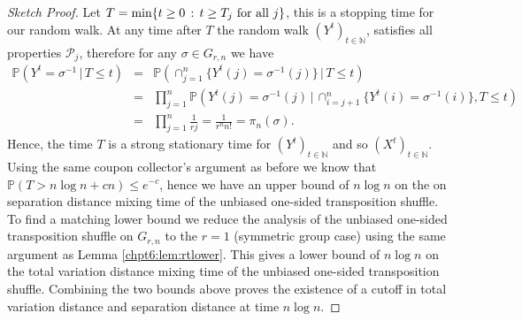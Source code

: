 \documentclass[11pt]{report}
\begin{document}
\begin{proof}[Sketch Proof]
	Let $T= \min \{t\geq 0 \,: \, t \geq T_{j} \textnormal{ for all $j$}\}$, this is a stopping time for our random walk. At any time after $T$ the random walk $(Y^{t})_{t\in\mathbb{N}}$, satisfies all properties $\mathcal{P}_{j}$, therefore for any $\sigma \in G_{r,n}$ we have
	\begin{eqnarray*}
		\mathbb{P}(Y^{t} = \sigma^{-1} \, | \, T\leq t) & = &\mathbb{P}\left( 
		\cap_{j=1}^{n} \{Y^{t}(j) = \sigma^{-1}(j) \} \, | \, T\leq t\right)\\  
		& = & \prod_{j=1}^{n}\mathbb{P}\left(  Y^{t}(j) = \sigma^{-1}(j) \, | \, 
		\cap_{i=j+1}^{n} \{
		Y^{t}(i) = \sigma^{-1}(i) \}, T\leq t\right)\\
		& = &\prod_{j=1}^{n} 
		\frac{1}{rj} = \frac{1}{r^{n}n!} = \pi_{n}(\sigma).
	\end{eqnarray*}
	Hence, the time $T$ is a strong stationary time for $(Y^{t})_{t \in \mathbb{N}}$ and so $(X^{t})_{t \in\mathbb{N}}$. Using the same coupon collector's argument as before we know that $\mathbb{P}(T>n\log n + cn) \leq e^{-c}$, hence we have an upper bound of $n\log n$ on the on separation distance mixing time of the unbiased one-sided transposition shuffle.
	To find a matching lower bound we reduce the analysis of the unbiased one-sided transposition shuffle on $G_{r,n}$ to the $r=1$ (symmetric group case) using the same argument as Lemma \ref{chpt6:lem:rtlower}. This gives a lower bound of $n\log n$ on the total variation distance mixing time of the unbiased one-sided transposition shuffle.  Combining the two bounds above proves the existence of a cutoff in total variation distance and separation distance at time $n\log n$.
\end{proof}




\newpage
{}


\end{document}
